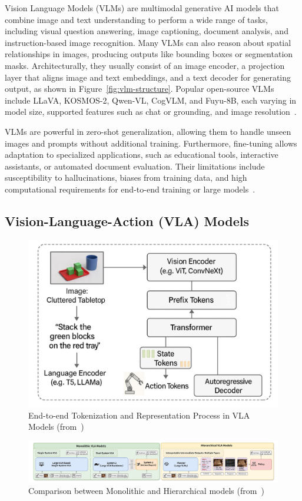 \documentclass[12pt]{extarticle}
\begin{document}
Vision Language Models (VLMs) are multimodal generative AI models that combine image and text understanding to perform a wide range of tasks, including visual question answering, image captioning, document analysis, and instruction-based image recognition. Many VLMs can also reason about spatial relationships in images, producing outputs like bounding boxes or segmentation masks. Architecturally, they usually consist of an image encoder, a projection layer that aligns image and text embeddings, and a text decoder for generating output, as shown in Figure~\ref{fig:vlm-structure}. Popular open-source VLMs include LLaVA, KOSMOS-2, Qwen-VL, CogVLM, and Fuyu-8B, each varying in model size, supported features such as chat or grounding, and image resolution~\cite{huggingface_vlms_2024}.

VLMs are powerful in zero-shot generalization, allowing them to handle unseen images and prompts without additional training. Furthermore, fine-tuning allows adaptation to specialized applications, such as educational tools, interactive assistants, or automated document evaluation. Their limitations include susceptibility to hallucinations, biases from training data, and high computational requirements for end-to-end training or large models~\cite{huggingface_vlms_2024}.
\subsection{Vision-Language-Action (VLA) Models}

\begin{figure}[htbp]
    \centering
    \includegraphics[width=0.8\linewidth]{images/vla.png}
    \caption{End-to-end Tokenization and Representation Process in VLA Models (from~\cite{vla})}
    \label{fig:vla}
\end{figure}

\begin{figure}[h]
    \centering
    \includegraphics[width=\linewidth]{images/vla-in-robot.png}
    \caption{Comparison between Monolithic and Hierarchical models (from~\cite{vla-in-robot})}
    \label{fig:vla-in-robot}
\end{figure}
\end{document}
